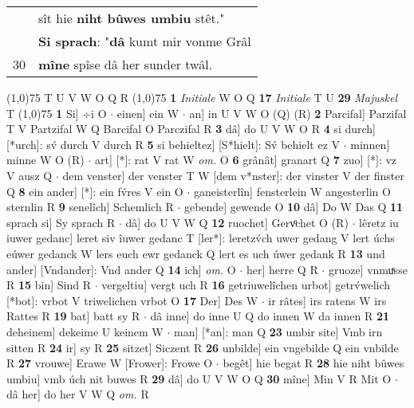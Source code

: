 \documentclass[8pt,a4paper,notitlepage]{article}
\begin{document}
\begin{table}[ht]
\begin{minipage}[t]{0.5\linewidth}
\begin{tabular}{rl}
 & sît hie \textbf{niht bûwes umbiu} stêt."\\ 
 & \textbf{Si sprach}: "\textbf{dâ} kumt mir vonme Grâl\\ 
30 & \textbf{mîne} spîse dâ her sunder twâl.\\ 
\end{tabular}
\scriptsize
\line(1,0){75} \newline
T U V W O Q R \newline
\line(1,0){75} \newline
\textbf{1} \textit{Initiale} W O Q  \textbf{17} \textit{Initiale} T U  \textbf{29} \textit{Majuskel} T  \newline
\line(1,0){75} \newline
\textbf{1} Si] ÷i O  $\cdot$ einen] ein W  $\cdot$ an] in U V W O (Q) (R) \textbf{2} Parcifal] Parzifal T V Partzifal W Q Barcifal O Parczifal R \textbf{3} dâ] do U V W O R \textbf{4} si durch] [*urch]: sv́ durch V durch R \textbf{5} si behieltez] [S*hielt]: Sv́ behielt ez V  $\cdot$ minnen] minne W O (R)  $\cdot$ art] [*]: rat V rat W \textit{om.} O \textbf{6} grânât] granart Q \textbf{7} zuo] [*]: vz V ausz Q  $\cdot$ dem venster] der venster T W [dem v*nster]: der vinster V der finster Q \textbf{8} ein ander] [*]: ein fv́res V ein O  $\cdot$ ganeisterlîn] fensterlein W angesterlin O sternlin R \textbf{9} senelîch] Schemlich R  $\cdot$ gebende] gewende O \textbf{10} dâ] Do W Das Q \textbf{11} sprach si] Sy sprach R  $\cdot$ dâ] do U V W Q \textbf{12} ruochet] Gervͦchet O (R)  $\cdot$ lêretz iu iuwer gedanc] leret siv îuwer gedanc T [ler*]: leretzv́ch uwer gedang V lert úchs eúwer gedanck W lers euch ewr gedanck Q lert es uch úwer gedank R \textbf{13} und ander] [Vndander]: Vnd ander Q \textbf{14} ich] \textit{om.} O  $\cdot$ her] herre Q R  $\cdot$ gruoze] vnmuͯsse R \textbf{15} bin] Sind R  $\cdot$ vergeltiu] vergt uch R \textbf{16} getriuwelîchen urbot] getrv́welich [*bot]: vrbot V triwelichen vrbot O \textbf{17} Der] Des W  $\cdot$ ir râtes] irs ratens W irs Rattes R \textbf{19} bat] batt sy R  $\cdot$ dâ inne] do inne U Q do innen W da innen R \textbf{21} deheinem] dekeime U keinem W  $\cdot$ man] [*an]: man Q \textbf{23} umbir site] Vmb irn sitten R \textbf{24} ir] sy R \textbf{25} sitzet] Siczent R \textbf{26} unbilde] ein vngebilde Q ein vnbilde R \textbf{27} vrouwe] Erawe W [Frower]: Frowe O  $\cdot$ begêt] hie begat R \textbf{28} hie niht bûwes umbiu] vmb úch nit buwes R \textbf{29} dâ] do U V W O Q \textbf{30} mîne] Min V R Mit O  $\cdot$ dâ her] do her V W Q \textit{om.} R \newline
\end{minipage}
\end{table}
\end{document}
